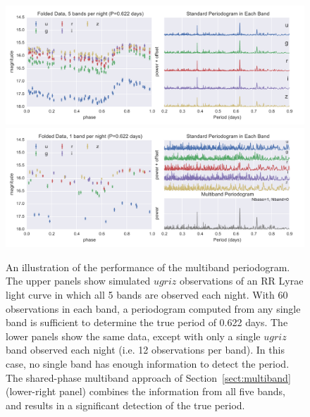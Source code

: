 \documentclass[12pt,preprint]{aastex}
\newcommand{\figlabel}[1]{\label{fig:#1}}
\newcommand{\Sect}[1]{Section~\ref{sect:#1}}
\newcommand{\sect}[1]{\Sect{#1}}
\begin{document}
\begin{figure}
  \centering
  \includegraphics[width=\textwidth]{fig05a.pdf}
  \includegraphics[width=\textwidth]{fig05b.pdf}
  \caption{
    An illustration of the performance of the multiband periodogram. The
    upper panels show simulated $ugriz$ observations of an RR Lyrae light
    curve in which all 5 bands are observed each night. With 60 observations
    in each band, a periodogram computed from any single band is sufficient to
    determine the true period of 0.622 days. The lower panels show the same
    data, except with only a single $ugriz$ band observed each night (i.e.
    12 observations per band). In this case, no single band has enough
    information to detect the period. The shared-phase multiband approach
    of \sect{multiband} (lower-right panel) combines the information from
    all five bands, and results in a significant detection of the true period.
  }
  \figlabel{multiband_sim}
\end{figure}
\end{document}
